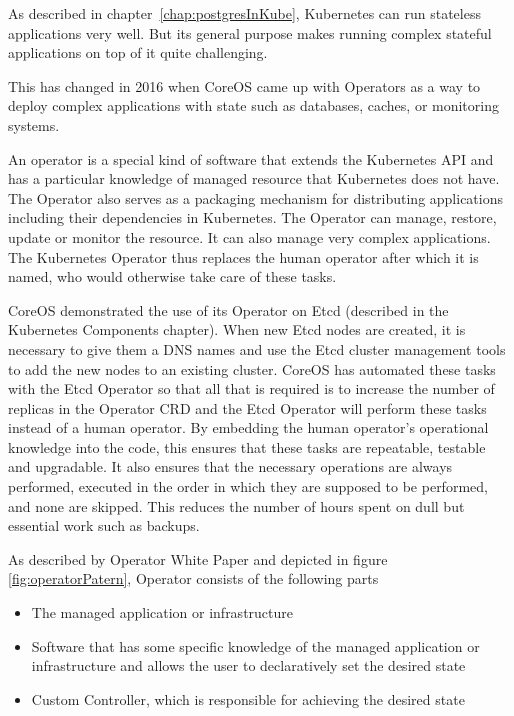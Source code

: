 \pagebreak
{}
\label{chap:operators}
As described in chapter~\ref{chap:postgresInKube}, Kubernetes can run stateless applications very well. But its general purpose makes running complex stateful applications on top of it quite challenging.


This has changed in 2016 when CoreOS came up with Operators as a way to deploy complex applications with state such as databases, caches, or monitoring systems. \cite{IArchiveCOSOperators}

An operator is a special kind of software that extends the Kubernetes API and has a particular knowledge of managed resource that Kubernetes does not have. The Operator also serves as a packaging mechanism for distributing applications including their dependencies in Kubernetes. The Operator can manage, restore, update or monitor the resource. It can also manage very complex applications. The Kubernetes Operator thus replaces the human operator after which it is named, who would otherwise take care of these tasks. \cite{OperatorsPreface} \cite{IArchiveCOSOperators}


CoreOS demonstrated the use of its Operator on Etcd (described in the Kubernetes Components chapter). When new Etcd nodes are created, it is necessary to give them a DNS names and use the Etcd cluster management tools to add the new nodes to an existing cluster. CoreOS has automated these tasks with the Etcd Operator so that all that is required is to increase the number of replicas in the Operator CRD and the Etcd Operator will perform these tasks instead of a human operator. \cite{IArchiveCOSOperators}
By embedding the human operator's operational knowledge into the code, this ensures that these tasks are repeatable, testable and upgradable. It also ensures that the necessary operations are always performed, executed in the order in which they are supposed to be performed, and none are skipped. This reduces the number of hours spent on dull but essential work such as backups. \cite{OperatorWhitepaper}

As described by Operator White Paper \cite{OperatorWhitepaper} and depicted in figure \ref{fig:operatorPatern}, Operator consists of the following parts
\begin{itemize}
  \item The managed application or infrastructure
  \item Software that has some specific knowledge of the managed application or infrastructure and allows the user to declaratively set the desired state
  \item Custom Controller, which is responsible for achieving the desired state
\end{itemize}

